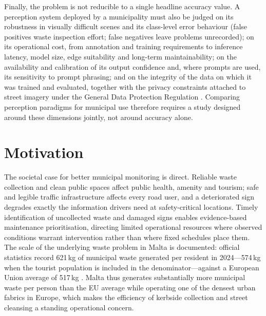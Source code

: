Finally, the problem is not reducible to a single headline accuracy value. A perception system deployed by a municipality must also be judged on its robustness in visually difficult scenes and its class-level error behaviour (false positives waste inspection effort; false negatives leave problems unrecorded); on its operational cost, from annotation and training requirements to inference latency, model size, edge suitability and long-term maintainability; on the availability and calibration of its output confidence \citep{guo2017calibration} and, where prompts are used, its sensitivity to prompt phrasing; and on the integrity of the data on which it was trained and evaluated, together with the privacy constraints attached to street imagery under the General Data Protection Regulation \citep{gdpr2016}. Comparing perception paradigms for municipal use therefore requires a study designed around these dimensions jointly, not around accuracy alone.

\section{Motivation}
\label{sec:motivation}

The societal case for better municipal monitoring is direct. Reliable waste collection and clean public spaces affect public health, amenity and tourism; safe and legible traffic infrastructure affects every road user, and a deteriorated sign degrades exactly the information drivers need at safety-critical locations. Timely identification of uncollected waste and damaged signs enables evidence-based maintenance prioritisation, directing limited operational resources where observed conditions warrant intervention rather than where fixed schedules place them. The scale of the underlying waste problem in Malta is documented: official statistics record 621\,kg of municipal waste generated per resident in 2024---574\,kg when the tourist population is included in the denominator---against a European Union average of 517\,kg \citep{nso2026municipalwaste,eurostat2026municipal}. Malta thus generates substantially more municipal waste per person than the EU average while operating one of the densest urban fabrics in Europe, which makes the efficiency of kerbside collection and street cleansing a standing operational concern.

